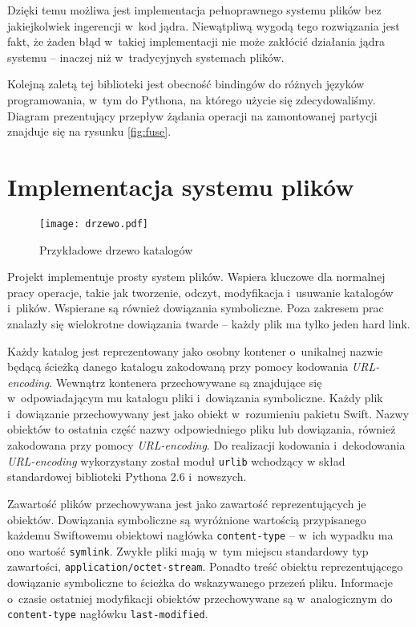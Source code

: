 Dzięki temu możliwa jest implementacja pełnoprawnego systemu plików bez
jakiejkolwiek ingerencji w~kod jądra. Niewątpliwą wygodą tego rozwiązania
jest fakt, że żaden błąd w~takiej implementacji nie może zakłócić działania
jądra systemu -- inaczej niż w~tradycyjnych systemach plików.

Kolejną zaletą tej biblioteki jest obecność bindingów do różnych języków
programowania, w~tym do Pythona, na którego użycie się zdecydowaliśmy. Diagram
prezentujący przepływ żądania operacji na zamontowanej partycji znajduje się na
rysunku \ref{fig:fuse}.

\section{Implementacja systemu plików}

\begin{figure}
    \centering
    \texttt{[image: drzewo.pdf]}
    \caption{Przykładowe drzewo katalogów}
	\label{fig:drzewo}
\end{figure}

Projekt \cb{} implementuje prosty system plików. Wspiera kluczowe dla normalnej
pracy operacje, takie jak tworzenie, odczyt, modyfikacja i~usuwanie katalogów
i~plików. Wspierane są również dowiązania symboliczne. Poza zakresem prac
znalazły się wielokrotne dowiązania twarde -- każdy plik ma tylko jeden hard
link.

Każdy katalog jest reprezentowany jako osobny kontener o~unikalnej nazwie będącą
ścieżką danego katalogu zakodowaną przy pomocy kodowania \textit{URL-encoding}.
Wewnątrz kontenera przechowywane są znajdujące się w~odpowiadającym mu katalogu
pliki i~dowiązania symboliczne. Każdy plik i~dowiązanie przechowywany jest jako
obiekt w~rozumieniu pakietu Swift. Nazwy obiektów to ostatnia część nazwy
odpowiedniego pliku lub dowiązania, również zakodowana przy pomocy
\textit{URL-encoding}. Do realizacji kodowania i~dekodowania
\textit{URL-encoding} wykorzystany został moduł \texttt{urlib} wchodzący w skład
standardowej biblioteki Pythona 2.6 i~nowszych.

Zawartość plików przechowywana jest jako zawartość reprezentujących je obiektów.
Dowiązania symboliczne są wyróżnione wartością przypisanego każdemu Swiftowemu
obiektowi nagłówka \texttt{content-type} -- w~ich wypadku ma ono wartość
\texttt{symlink}. Zwykłe pliki mają w~tym miejscu standardowy typ zawartości,
\texttt{application/octet-stream}. Ponadto treść obiektu reprezentującego
dowiązanie symboliczne to ścieżka do wskazywanego przezeń pliku. Informacje
o~czasie ostatniej modyfikacji obiektów przechowywane są w~analogicznym do
\texttt{content-type} nagłówku \texttt{last-modified}.

